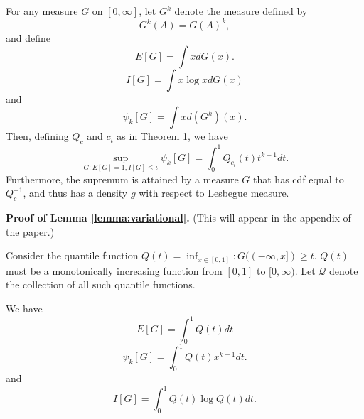 \documentclass[12pt]{article}
\begin{document}
\begin{lemma}\label{lemma:variational}
For any measure $G$ on $[0, \infty]$,
let $G^k$ denote the measure defined by
\[
G^k(A) = G(A)^k,
\]
and define
\[
E[G] = \int x dG(x).
\]
\[
I[G] = \int x \log x dG(x)
\]
and
\[
\psi_k[G] = \int x d(G^k)(x).
\]
Then, defining $Q_c$ and $c_\iota$ as in Theorem 1, we have
\[
\sup_{G: E[G] = 1, I[G] \leq \iota} \psi_k[G] = \int_0^1 Q_{c_\iota}(t) t^{k-1} dt.
\]
Furthermore, the supremum is attained by a measure $G$ that has cdf
equal to $Q_c^{-1}$, and thus has a density $g$ with respect to
Lesbegue measure.
\end{lemma}

\textbf{Proof of Lemma \ref{lemma:variational}.} (This will appear in the appendix of the paper.)

Consider the quantile function $Q(t) = \inf_{x \in [0,1]}: G((-\infty,
x]) \geq t.$ $Q(t)$ must be a monotonically increasing function from
$[0,1]$ to $[0,\infty).$ Let $\mathcal{Q}$ denote the collection of
all such quantile functions.

We have
\[
E[G] = \int_0^1 Q(t) dt
\]
\[
\psi_k[G] = \int_0^1 Q(t) x^{k-1} dt.
\]
and
\[
I[G] = \int_0^1 Q(t) \log Q(t) dt.
\]
\end{document}
